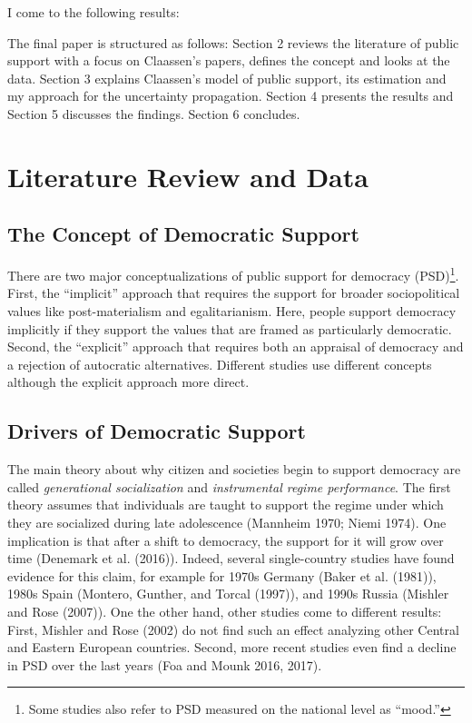 \documentclass[12pt,english,a4paper,oneside]{article}
\theoremstyle{definition}
\theoremstyle{definition}
\theoremstyle{definition}
\theoremstyle{definition}
\theoremstyle{remark}
\begin{document}
I come to the following results:

The final paper is structured as follows: Section 2 reviews the literature of public support with a focus on Claassen's papers, defines the concept and looks at the data. Section 3 explains Claassen's model of public support, its estimation and my approach for the uncertainty propagation. Section 4 presents the results and Section 5 discusses the findings. Section 6 concludes.

\hypertarget{literature-review-and-data}{%
\section{Literature Review and Data}\label{literature-review-and-data}}

\hypertarget{the-concept-of-democratic-support}{%
\subsection{The Concept of Democratic Support}\label{the-concept-of-democratic-support}}

There are two major conceptualizations of public support for democracy (PSD)\footnote{Some studies also refer to PSD measured on the national level as \enquote{mood.}}. First, the \enquote{implicit} approach that requires the support for broader sociopolitical values like post-materialism and egalitarianism. Here, people support democracy implicitly if they support the values that are framed as particularly democratic. Second, the \enquote{explicit} approach that requires both an appraisal of democracy and a rejection of autocratic alternatives. Different studies use different concepts although the explicit approach more direct.

\hypertarget{drivers-of-democratic-support}{%
\subsection{Drivers of Democratic Support}\label{drivers-of-democratic-support}}

The main theory about why citizen and societies begin to support democracy are called \emph{generational socialization} and \emph{instrumental regime performance}. The first theory assumes that individuals are taught to support the regime under which they are socialized during late adolescence (Mannheim 1970; Niemi 1974). One implication is that after a shift to democracy, the support for it will grow over time (Denemark et al. (2016)). Indeed, several single-country studies have found evidence for this claim, for example for 1970s Germany (Baker et al. (1981)), 1980s Spain (Montero, Gunther, and Torcal (1997)), and 1990s Russia (Mishler and Rose (2007)). One the other hand, other studies come to different results: First, Mishler and Rose (2002) do not find such an effect analyzing other Central and Eastern European countries. Second, more recent studies even find a decline in PSD over the last years (Foa and Mounk 2016, 2017).
\end{document}
